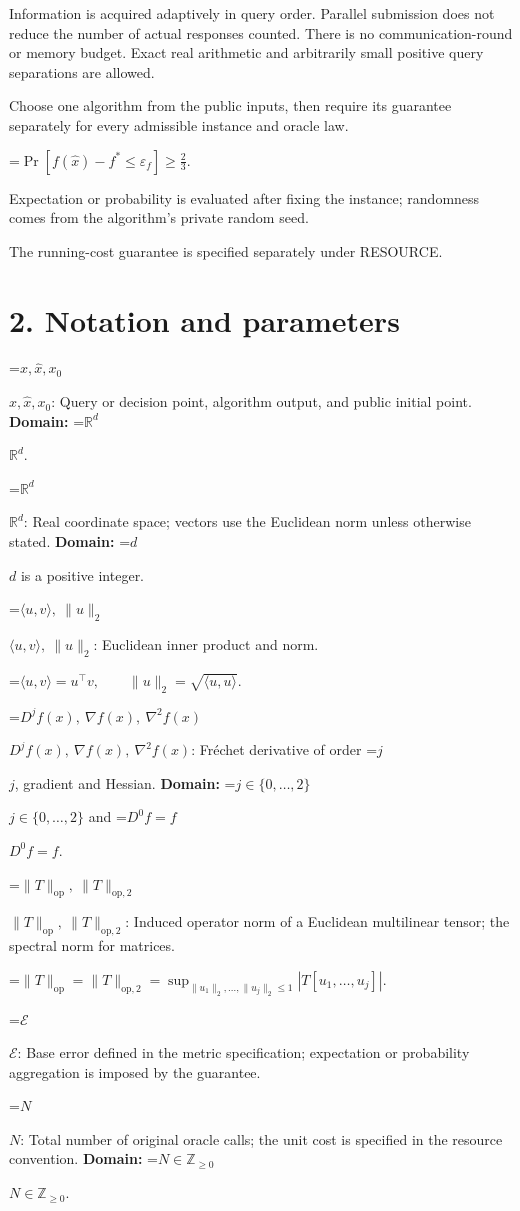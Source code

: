 \documentclass[10pt,a4paper]{article}
\newcommand{\AtlasMath}[1]{\par\begingroup\centering\setbox0=\hbox{$\displaystyle #1$}\ifdim\wd0>1.4\linewidth\typeout{ATLAS WIDE FORMULA: \the\wd0}\fi\ifdim\wd0>\linewidth\resizebox{\linewidth}{!}{\box0}\else\box0\fi\par\endgroup}
\newcommand{\AtlasInlineMath}[1]{\begingroup\setbox0=\hbox{$#1$}\ifdim\wd0>.4\linewidth\endgroup\AtlasMath{#1}\else\endgroup$#1$\fi}
\begin{document}
Information is acquired adaptively in query order. Parallel submission does not reduce the number of actual responses counted. There is no communication-round or memory budget. Exact real arithmetic and arbitrarily small positive query separations are allowed.

Choose one algorithm from the public inputs, then require its guarantee separately for every admissible instance and oracle law.


\AtlasMath{\Pr\!\left[f(\widehat{x})-f^*\le \varepsilon_f\right]\ge\frac23.}


Expectation or probability is evaluated after fixing the instance; randomness comes from the algorithm's private random seed.

The running-cost guarantee is specified separately under RESOURCE.

\section{2. Notation and parameters}
\AtlasInlineMath{x,\widehat{x},x_0}: Query or decision point, algorithm output, and public initial point. \textbf{Domain:} \AtlasInlineMath{\mathbb{R}^d}.

\AtlasInlineMath{\mathbb{R}^d}: Real coordinate space; vectors use the Euclidean norm unless otherwise stated. \textbf{Domain:} \AtlasInlineMath{d} is a positive integer.

\AtlasInlineMath{\langle u,v\rangle,\ \|u\|_2}: Euclidean inner product and norm.


\AtlasMath{\langle u,v\rangle=u^\top v,\qquad\|u\|_2=\sqrt{\langle u,u\rangle}.}


\AtlasInlineMath{D^jf(x),\ \nabla f(x),\ \nabla^2f(x)}: Fréchet derivative of order \AtlasInlineMath{j}, gradient and Hessian. \textbf{Domain:} \AtlasInlineMath{j\in\{0,\ldots,2\}} and \AtlasInlineMath{D^0f=f}.

\AtlasInlineMath{\|T\|_{\mathrm{op}},\ \|T\|_{\mathrm{op},2}}: Induced operator norm of a Euclidean multilinear tensor; the spectral norm for matrices.


\AtlasMath{\|T\|_{\mathrm{op}}=\|T\|_{\mathrm{op},2}=\sup_{\|u_1\|_2,\ldots,\|u_j\|_2\le1}|T[u_1,\ldots,u_j]|.}


\AtlasInlineMath{\mathcal{E}}: Base error defined in the metric specification; expectation or probability aggregation is imposed by the guarantee.

\AtlasInlineMath{N}: Total number of original oracle calls; the unit cost is specified in the resource convention. \textbf{Domain:} \AtlasInlineMath{N\in\mathbb{Z}_{\ge0}}.
\end{document}

